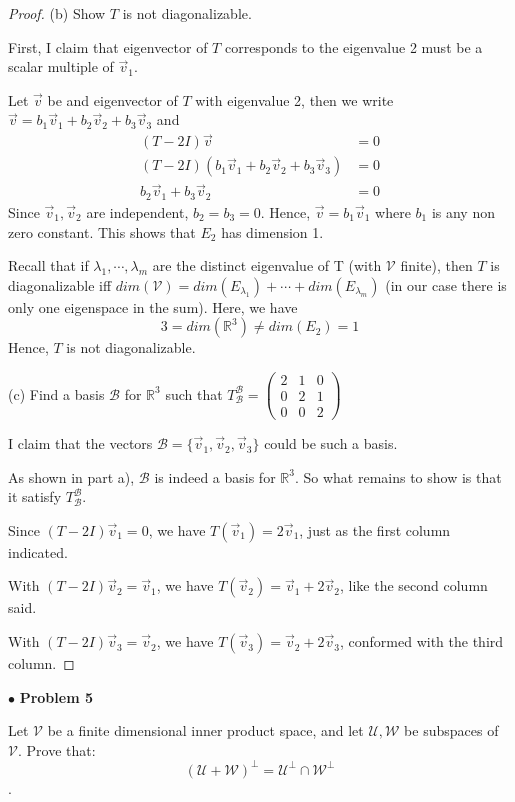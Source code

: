 \documentclass{article}
\begin{document}
\begin{proof}
(b) Show $T$ is not diagonalizable.
\smallskip

First, I claim that eigenvector of $T$ corresponds to the eigenvalue 2 must be a scalar multiple of $\vec{v}_1$. 

Let $\vec{v}$ be and eigenvector of $T$ with eigenvalue 2, then we write $\vec{v} = b_1 \vec{v}_1 + b_2 \vec{v}_2 + b_3 \vec{v}_3$ and 
\begin{align*}
(T-2I) \vec{v} &= 0 \\
(T-2I) (b_1 \vec{v}_1 + b_2 \vec{v}_2 + b_3 \vec{v}_3) &= 0 \\
b_2 \vec{v}_1 + b_3 \vec{v}_2 &= 0
\end{align*}
Since $\vec{v}_1, \vec{v}_2$ are independent, $b_2 = b_3 =0$. Hence, $\vec{v}= b_1 \vec{v}_1$ where $b_1$ is any non zero constant. This shows that $E_2$ has dimension 1.

Recall that if $\lambda_1, \cdots, \lambda_m$ are the distinct eigenvalue of T (with $\mathcal{V}$ finite), then $T$ is diagonalizable iff $dim( \mathcal{V}) = dim(E_{\lambda_1})+ \cdots + dim(E_{\lambda_m})$ (in our case there is only one eigenspace in the sum). Here, we have
$$
3 = dim(\mathbb{R}^3) \ne dim(E_2) = 1
$$
Hence, $T$ is not diagonalizable.
\bigskip

(c) Find a basis $\mathcal{B}$ for $\mathbb{R}^3$ such that $T^\mathcal{B}_{\mathcal{B}} = \begin{pmatrix} 2 &1 & 0 \\0&2&1 \\0&0&2 \end{pmatrix}$

I claim that the vectors $\mathcal{B} = \{ \vec{v}_1, \vec{v}_2, \vec{v}_3 \}$ could be such a basis.

As shown in part a), $\mathcal{B}$ is indeed a basis for $\mathbb{R}^3$. So what remains to show is that it satisfy $T^\mathcal{B}_{\mathcal{B}}$.

Since $(T-2I)\vec{v}_1 = 0$, we have $T(\vec{v}_1) = 2\vec{v}_1$, just as the first column indicated. 

With $(T-2I)\vec{v}_2 = \vec{v}_1$, we have $T(\vec{v}_2) = \vec{v}_1 + 2\vec{v}_2$, like the second column said.

With $(T-2I)\vec{v}_3 = \vec{v}_2$, we have $T(\vec{v}_3) = \vec{v}_2 + 2\vec{v}_3$, conformed with the third column. 
\end{proof}

\newpage
$ \bullet$ \textbf{Problem 5}
\medskip

\begin{itshape}
Let $\mathcal{V}$ be a finite dimensional inner product space, and let $\mathcal{U}, \mathcal{W}$ be subspaces of $\mathcal{V}$. Prove that: 
$$(\mathcal{U}+\mathcal{W})^\perp = \mathcal{U}^\perp \cap \mathcal{W}^\perp$$.


\end{itshape}
\medskip
\end{document}

